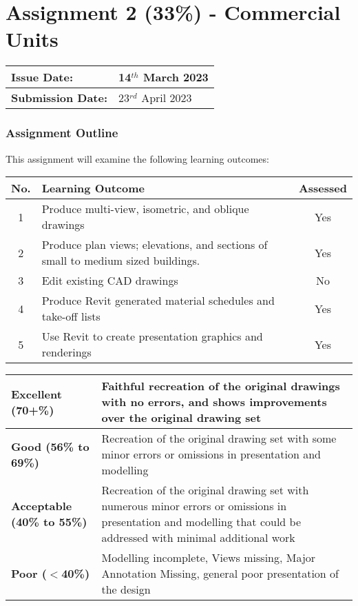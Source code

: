 
	
\part*{Assignment 2 (33\%) - Commercial Units}

\begin{tabularx}{\textwidth}{ |X|X| }
	\hline
	\textbf{Issue Date:} & 14$^{th}$ March 2023\\
	\hline 
	\textbf{Submission Date:}  & 23$^{rd}$ April 2023  \\
	\hline
\end{tabularx}

\section*{Assignment Outline}

This assignment will examine the following learning outcomes:

\begin{tabularx}{\textwidth}{ |c|X|c| }
	\hline
	\textbf{No.} & \textbf{Learning Outcome} & \textbf{Assessed} \\
	\hline 
	1  & Produce multi-view, isometric, and oblique drawings & Yes \\
	2  & Produce plan views; elevations, and sections of small to medium sized buildings. & Yes \\
	3  & Edit existing CAD drawings & No \\
	4  & Produce Revit generated material schedules and take-off lists & Yes \\
	5  & Use Revit to create presentation graphics and renderings & Yes \\
	\hline
\end{tabularx}

\vspace{1cm}

\begin{tabularx}{\textwidth}{ |l|X| }
	\hline 
	\textbf{Excellent (70+\%)} & Faithful recreation of the original drawings with no errors, and shows improvements over the original drawing set\\ 
	\hline
	\textbf{Good (56\% to 69\%)} & Recreation of the original drawing set with some minor errors or omissions in presentation and modelling \\
	\hline
	\textbf{Acceptable (40\% to 55\%)} & Recreation of the original drawing set with numerous minor errors or omissions in presentation and modelling that could be addressed with minimal additional work \\ 
	\hline
	\textbf{Poor ($<$40\%)} & Modelling incomplete, Views missing, Major Annotation Missing, general poor presentation of the design  \\
	\hline
\end{tabularx}

